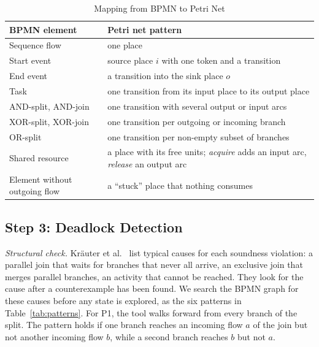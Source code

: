 \documentclass[conference]{IEEEtran}
\begin{document}
\begin{table}[htbp]
\caption{Mapping from BPMN to Petri Net}
\begin{center}
\begin{tabular}{|p{}|p{}|}
\hline
\textbf{BPMN element} & \textbf{Petri net pattern} \\
\hline
Sequence flow & one place \\
Start event & source place $i$ with one token and a transition \\
End event & a transition into the sink place $o$ \\
Task & one transition from its input place to its output place \\
AND-split, AND-join & one transition with several output or input arcs \\
XOR-split, XOR-join & one transition per outgoing or incoming branch \\
OR-split & one transition per non-empty subset of branches \\
Shared resource & a place with its free units; \emph{acquire} adds an input arc, \emph{release} an output arc \\
Element without outgoing flow & a ``stuck'' place that nothing consumes \\
\hline
\end{tabular}
\label{tab:map}
\end{center}
\end{table}

\subsection{Step 3: Deadlock Detection}
\emph{Structural check.} Kr\"auter et al.~\cite{kraeuter} list typical causes for each soundness violation: a
parallel join that waits for branches that never all arrive, an exclusive join that merges parallel branches,
an activity that cannot be reached. They look for the cause after a counterexample has been found. We search
the BPMN graph for these causes before any state is explored, as the six patterns in Table~\ref{tab:patterns}.
For P1, the tool walks forward from every branch of the split. The pattern holds if one branch reaches an
incoming flow $a$ of the join but not another incoming flow $b$, while a second branch reaches $b$ but not $a$.
\end{document}
